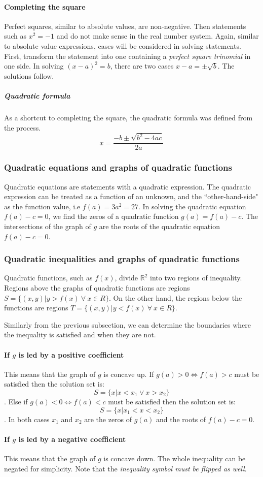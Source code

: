 \paragraph{Completing the square}
Perfect squares, similar to absolute values, are non-negative.
Then statements such as $x^2 = -1$ and do not make sense in the real number system.
Again, similar to absolute value expressions, cases will be considered in solving statements.
First, transform the statement into one containing a \emph{perfect square trinomial} in one side.
In solving $(x-a)^2 = b$, there are two cases $x-a = \pm \sqrt{b}$.
The solutions follow.

\subparagraph{Quadratic formula}
As a shortcut to completing the square, the quadratic formula was defined from the process.
\[
x = \dfrac{-b \pm \sqrt{b^2-4ac}}{2a}
\]

\subsubsection{Quadratic equations and graphs of quadratic functions}
Quadratic equations are statements with a quadratic expression.
The quadratic expression can be treated as a function of an unknown, and the ``other-hand-side" as the function value, i.e $f(a) = 3a^2 = 27$.
In solving the quadratic equation $f(a)-c = 0$, we find the zeros of a quadratic function $g(a) = f(a)-c$.
The intersections of the graph of $g$ are the roots of the quadratic equation $f(a)-c = 0$.

\subsubsection{Quadratic inequalities and graphs of quadratic functions}
Quadratic functions, such as $f(x)$, divide $\mathbb{R}^2$ into two regions of inequality.
Regions above the graphs of quadratic functions are regions $S = \{(x, y) | y > f(x)\ \forall\ x \in R\}$.
On the other hand, the regions below the functions are regions $T = \{(x, y) | y < f(x)\ \forall\ x \in R\}$.

Similarly from the previous subsection, we can determine the boundaries where the inequality is satisfied and when they are not.

\paragraph{If $g$ is led by a positive coefficient}
This means that the graph of $g$ is concave up.
If $g(a) > 0 \iff f(a) > c$ must be satisfied then the solution set is: $$S = \{x | x < x_1 \lor x > x_2\}$$.
Else if $g(a) < 0 \iff f(a) < c$ must be satisfied then the solution set is: $$S = \{x | x_1 < x < x_2\}$$.
In both cases $x_1$ and $x_2$ are the zeros of $g(a)$ and the roots of $f(a) - c = 0$.

\paragraph{If $g$ is led by a negative coefficient}
This means that the graph of $g$ is concave down.
The whole inequality can be negated for simplicity.
Note that the \emph{inequality symbol must be flipped as well}.
